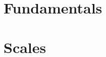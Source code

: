 \documentclass{book}
\begin{document}
    \chapter{Fundamentals}
    
    \chapter{Scales}
    
\end{document}
